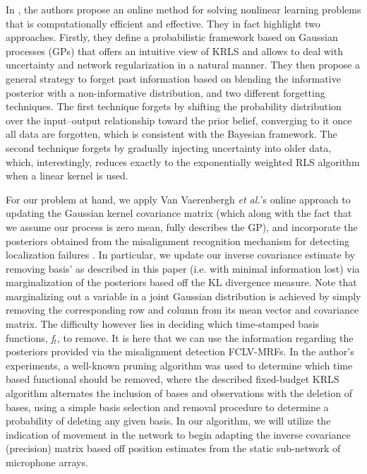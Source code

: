 \documentclass{article}
\begin{document}
In \cite{SVV_krlsTrackTimeVaryRegr}, the authors propose an online method for solving nonlinear learning problems that is computationally efficient and effective. They in fact highlight two approaches. Firstly, they define a probabilistic framework based on Gaussian processes (GPs) that offers an intuitive view of KRLS and allows to deal with uncertainty and network regularization in a natural manner. They then propose a general strategy to forget past information based on blending the informative posterior with a non-informative distribution, and two different forgetting techniques. The ﬁrst technique forgets by shifting the probability distribution over the input–output relationship toward the prior belief, converging to it once all data are forgotten, which is consistent with the Bayesian framework. The second technique forgets by gradually injecting uncertainty into older data, which, interestingly, reduces exactly to the exponentially weighted RLS algorithm when a linear kernel is used. 

For our problem at hand, we apply Van Vaerenbergh \textit{et al.}'s  online approach to updating the Gaussian kernel covariance matrix (which along with the fact that we assume our process is zero mean, fully describes the GP), and incorporate the posteriors obtained from the misalignment recognition mechanism for detecting localization failures \cite{NA_misalignmentRecMRFsFcn}. In particular, we update our inverse covariance estimate by removing basis' as described in this paper (i.e. with minimal information lost) via marginalization of the posteriors based off the KL divergence measure. Note that marginalizing out a variable in a joint Gaussian distribution is achieved by simply removing the corresponding row and column from its mean vector and covariance matrix. The difficulty however lies in deciding which time-stamped basis functions, \textit{f$_t$}, to remove. It is here that we can use the information regarding the posteriors provided via the misalignment detection FCLV-MRFs. In the author's experiments, a well-known pruning algorithm was used to determine which time based functional should be removed, where the described ﬁxed-budget KRLS algorithm alternates the inclusion of bases and observations with the deletion of bases, using a simple basis selection and removal procedure to determine a probability of deleting any given basis. In our algorithm, we will utilize the indication of movement in the network to begin adapting the inverse covariance (precision) matrix based off position estimates from the static sub-network of microphone arrays. 
\end{document}
